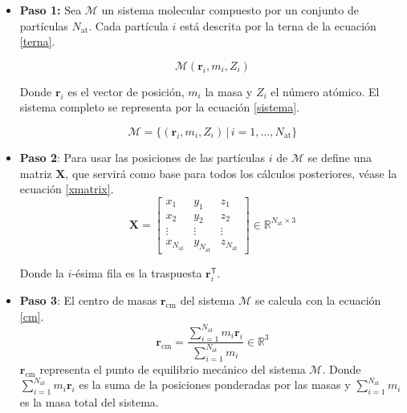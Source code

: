 	\begin{itemize}
		\item \textbf{Paso 1:}
		Sea $\mathcal{M}$ un sistema molecular compuesto por un conjunto de part\'{i}culas $N_{\text{at}}$. Cada part\'{i}cula $i$ est\'{a} descrita por la terna de la ecuaci\'{o}n \ref{terna}.
		
		\begin{equation}
			\mathcal{M} (\mathbf{r}_i, m_i, Z_i)
			\label{terna}
		\end{equation}
		
		Donde $\mathbf{r}_i$ es el vector de posici\'{o}n, $m_i$ la masa y $Z_i$ el n\'{u}mero at\'{o}mico. El sistema completo se representa por la ecuaci\'{o}n \ref{sistema}.	
		
		\begin{equation}
			\mathcal{M} = \bigl\{(\mathbf{r}_i, m_i, Z_i) \,\big|\, i = 1,\dots,N_{\text{at}}\bigr\}
			\label{sistema}
		\end{equation}
	
		\item \textbf{Paso 2}: Para usar las posiciones de las part\'{i}culas $i$ de $\mathcal{M}$ se define una matriz $\mathbf{X}$, que servir\'{a} como base para todos los c\'{a}lculos posteriores, v\'{e}ase la ecuaci\'{o}n \ref{xmatrix}.
		\begin{equation}
			\mathbf{X} = \begin{bmatrix}
				x_1 & y_1 & z_1 \\
				x_2 & y_2 & z_2 \\
				\vdots & \vdots & \vdots \\
				x_{N_{\text{at}}} & y_{N_{\text{at}}} & z_{N_{\text{at}}}
			\end{bmatrix} \in \mathbb{R}^{N_{\text{at}} \times 3}
			\label{xmatrix}
		\end{equation}
		
		Donde la $i$-\'{e}sima fila es la traspuesta $\mathbf{r}_i^{\mathsf T}$.
		
		
		\item \textbf{Paso 3}: El centro de masas $\mathbf{r}_{\text{cm}}$ del sistema $\mathcal{M}$ se calcula con la ecuaci\'{o}n \ref{cm}.
		\begin{equation}
			\mathbf{r}_{\text{cm}}
			= \frac{\displaystyle \sum_{i=1}^{N_{\text{at}}} m_i \mathbf{r}_i}
			{\displaystyle \sum_{i=1}^{N_{\text{at}}} m_i}
			\in \mathbb{R}^3
			\label{cm}
		\end{equation}
		$\mathbf{r}_{\text{cm}}$ representa el punto de equilibrio mec\'{a}nico del sistema $\mathcal{M}$. 
		Donde $\displaystyle \sum_{i=1}^{N_{\text{at}}} m_i \mathbf{r}_i$ es la suma de la posiciones ponderadas por las masas y $\displaystyle \sum_{i=1}^{N_{\text{at}}} m_i$ es la masa total del sistema.
		

\end{itemize}
